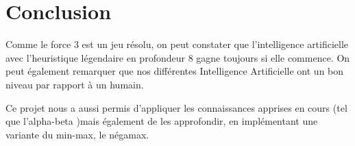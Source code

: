 \chapter{Conclusion}

Comme le force 3 est un jeu résolu, on peut constater que l'intelligence
artificielle avec l'heuristique légendaire en profondeur 8 gagne toujours si
elle commence.
On peut également remarquer que nos différentes Intelligence
Artificielle ont un bon niveau par rapport à un humain.

Ce projet nous a aussi permis d'appliquer les connaissances apprises en cours
(tel que l'alpha-beta )mais également de les approfondir, en implémentant une
variante du min-max, le négamax.